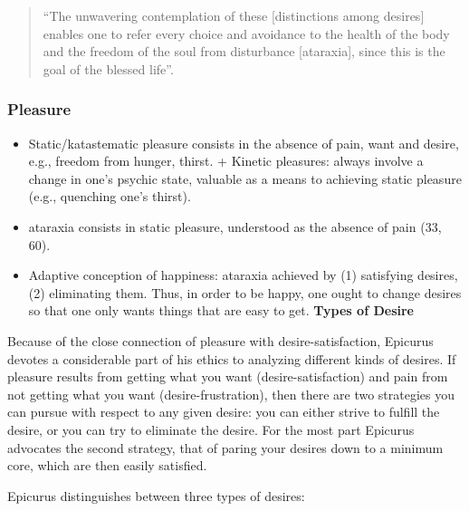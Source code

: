\documentclass[]{article}
\begin{document}
\begin{quote}
``The unwavering contemplation of these {[}distinctions among desires{]}
enables one to refer every choice and avoidance to the health of the
body and the freedom of the soul from disturbance {[}ataraxia{]}, since
this is the goal of the blessed life''.
\end{quote}

\subsubsection{Pleasure}\label{pleasure}

\begin{itemize}
\itemsep1pt\parskip0pt
\item
  Static/katastematic pleasure consists in the absence of pain, want and
  desire, e.g., freedom from hunger, thirst. + Kinetic pleasures: always
  involve a change in one's psychic state, valuable as a means to
  achieving static pleasure (e.g., quenching one's thirst).
\item
  ataraxia consists in static pleasure, understood as the absence of
  pain (33, 60).
\item
  Adaptive conception of happiness: ataraxia achieved by (1) satisfying
  desires, (2) eliminating them. Thus, in order to be happy, one ought
  to change desires so that one only wants things that are easy to get.
  \textbf{Types of Desire}
\end{itemize}

Because of the close connection of pleasure with desire-satisfaction,
Epicurus devotes a considerable part of his ethics to analyzing
different kinds of desires. If pleasure results from getting what you
want (desire-satisfaction) and pain from not getting what you want
(desire-frustration), then there are two strategies you can pursue with
respect to any given desire: you can either strive to fulfill the
desire, or you can try to eliminate the desire. For the most part
Epicurus advocates the second strategy, that of paring your desires down
to a minimum core, which are then easily satisfied.

Epicurus distinguishes between three types of desires:
\end{document}
